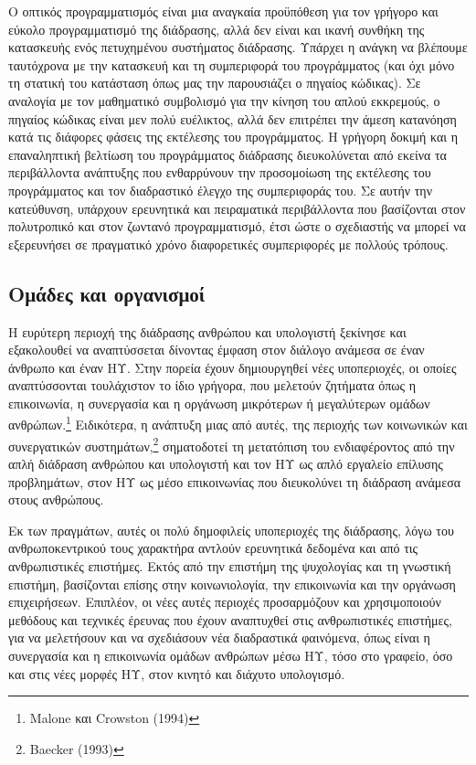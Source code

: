 \documentclass[
]{article}
\begin{document}
Ο οπτικός προγραμματισμός είναι μια αναγκαία προϋπόθεση για τον γρήγορο
και εύκολο προγραμματισμό της διάδρασης, αλλά δεν είναι και ικανή
συνθήκη της κατασκευής ενός πετυχημένου συστήματος διάδρασης. Υπάρχει η
ανάγκη να βλέπουμε ταυτόχρονα με την κατασκευή και τη συμπεριφορά του
προγράμματος (και όχι μόνο τη στατική του κατάσταση όπως μας την
παρουσιάζει ο πηγαίος κώδικας). Σε αναλογία με τον μαθηματικό συμβολισμό
για την κίνηση του απλού εκκρεμούς, ο πηγαίος κώδικας είναι μεν πολύ
ευέλικτος, αλλά δεν επιτρέπει την άμεση κατανόηση κατά τις διάφορες
φάσεις της εκτέλεσης του προγράμματος. Η γρήγορη δοκιμή και η
επαναληπτική βελτίωση του προγράμματος διάδρασης διευκολύνεται από
εκείνα τα περιβάλλοντα ανάπτυξης που ενθαρρύνουν την προσομοίωση της
εκτέλεσης του προγράμματος και τον διαδραστικό έλεγχο της συμπεριφοράς
του. Σε αυτήν την κατεύθυνση, υπάρχουν ερευνητικά και πειραματικά
περιβάλλοντα που βασίζονται στον πολυτροπικό και στον ζωντανό
προγραμματισμό, έτσι ώστε ο σχεδιαστής να μπορεί να εξερευνήσει σε
πραγματικό χρόνο διαφορετικές συμπεριφορές με πολλούς τρόπους.

\hypertarget{ux3bfux3bcux3acux3b4ux3b5ux3c2-ux3baux3b1ux3b9-ux3bfux3c1ux3b3ux3b1ux3bdux3b9ux3c3ux3bcux3bfux3af}{%
\subsection{Ομάδες και
οργανισμοί}\label{ux3bfux3bcux3acux3b4ux3b5ux3c2-ux3baux3b1ux3b9-ux3bfux3c1ux3b3ux3b1ux3bdux3b9ux3c3ux3bcux3bfux3af}}

Η ευρύτερη περιοχή της διάδρασης ανθρώπου και υπολογιστή ξεκίνησε και
εξακολουθεί να αναπτύσσεται δίνοντας έμφαση στον διάλογο ανάμεσα σε έναν
άνθρωπο και έναν ΗΥ. Στην πορεία έχουν δημιουργηθεί νέες υποπεριοχές, οι
οποίες αναπτύσσονται τουλάχιστον το ίδιο γρήγορα, που μελετούν ζητήματα
όπως η επικοινωνία, η συνεργασία και η οργάνωση μικρότερων ή μεγαλύτερων
ομάδων ανθρώπων.\footnote{Malone και Crowston (1994)} Ειδικότερα, η
ανάπτυξη μιας από αυτές, της περιοχής των κοινωνικών και συνεργατικών
συστημάτων,\footnote{Baecker (1993)} σηματοδοτεί τη μετατόπιση του
ενδιαφέροντος από την απλή διάδραση ανθρώπου και υπολογιστή και τον ΗΥ
ως απλό εργαλείο επίλυσης προβλημάτων, στον ΗΥ ως μέσο επικοινωνίας που
διευκολύνει τη διάδραση ανάμεσα στους ανθρώπους.

Εκ των πραγμάτων, αυτές οι πολύ δημοφιλείς υποπεριοχές της διάδρασης,
λόγω του ανθρωποκεντρικού τους χαρακτήρα αντλούν ερευνητικά δεδομένα και
από τις ανθρωπιστικές επιστήμες. Εκτός από την επιστήμη της ψυχολογίας
και τη γνωστική επιστήμη, βασίζονται επίσης στην κοινωνιολογία, την
επικοινωνία και την οργάνωση επιχειρήσεων. Επιπλέον, οι νέες αυτές
περιοχές προσαρμόζουν και χρησιμοποιούν μεθόδους και τεχνικές έρευνας
που έχουν αναπτυχθεί στις ανθρωπιστικές επιστήμες, για να μελετήσουν και
να σχεδιάσουν νέα διαδραστικά φαινόμενα, όπως είναι η συνεργασία και η
επικοινωνία ομάδων ανθρώπων μέσω ΗΥ, τόσο στο γραφείο, όσο και στις νέες
μορφές ΗΥ, στον κινητό και διάχυτο υπολογισμό.
\end{document}
